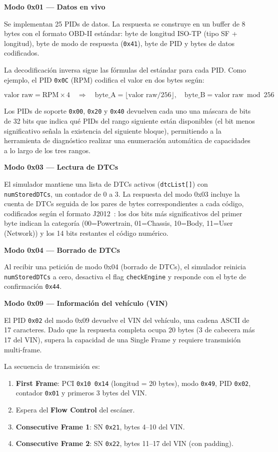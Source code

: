 \medskip
\noindent\textbf{Modo 0x01 — Datos en vivo}

Se implementan 25 PIDs de datos. La respuesta se construye en un buffer de 8 bytes con el formato OBD-II estándar: byte de longitud ISO-TP (tipo SF + longitud), byte de modo de respuesta (\texttt{0x41}), byte de PID y bytes de datos codificados.

La decodificación inversa sigue las fórmulas del estándar para cada PID. Como ejemplo, el PID \texttt{0x0C} (RPM) codifica el valor en dos bytes según:

\[
    \text{valor raw} = \text{RPM} \times 4 \quad \Rightarrow \quad
    \text{byte\_A} = \lfloor \text{valor raw} / 256 \rfloor, \quad
    \text{byte\_B} = \text{valor raw} \bmod 256
\]

Los PIDs de soporte \texttt{0x00}, \texttt{0x20} y \texttt{0x40} devuelven cada uno una máscara de bits de 32 bits que indica qué PIDs del rango siguiente están disponibles (el bit menos significativo señala la existencia del siguiente bloque), permitiendo a la herramienta de diagnóstico realizar una enumeración automática de capacidades a lo largo de los tres rangos.

\medskip
\noindent\textbf{Modo 0x03 — Lectura de DTCs}

El simulador mantiene una lista de DTCs activos (\texttt{dtcList[]}) con \texttt{numStoredDTCs}, un contador de 0 a 3. La respuesta del modo 0x03 incluye la cuenta de DTCs seguida de los pares de bytes correspondientes a cada código, codificados según el formato J2012~\cite{SAEJ2012:2016}: los dos bits más significativos del primer byte indican la categoría (00=Powertrain, 01=Chassis, 10=Body, 11=User (Network)) y los 14 bits restantes el código numérico.

\medskip
\noindent\textbf{Modo 0x04 — Borrado de DTCs}

Al recibir una petición de modo 0x04 (borrado de DTCs), el simulador reinicia \texttt{numStoredDTCs} a cero, desactiva el flag \texttt{checkEngine} y responde con el byte de confirmación \texttt{0x44}.

\medskip
\noindent\textbf{Modo 0x09 — Información del vehículo (VIN)}

El PID \texttt{0x02} del modo 0x09 devuelve el VIN del vehículo, una cadena ASCII de 17 caracteres. Dado que la respuesta completa ocupa 20 bytes (3 de cabecera más 17 del VIN), supera la capacidad de una Single Frame y requiere transmisión multi-frame.

La secuencia de transmisión es:
\begin{enumerate}
    \item \textbf{First Frame}: PCI \texttt{0x10 0x14} (longitud = 20 bytes), modo \texttt{0x49}, PID \texttt{0x02}, contador \texttt{0x01} y primeros 3 bytes del VIN.
    \item Espera del \textbf{Flow Control} del escáner.
    \item \textbf{Consecutive Frame 1}: SN \texttt{0x21}, bytes 4--10 del VIN.
    \item \textbf{Consecutive Frame 2}: SN \texttt{0x22}, bytes 11--17 del VIN (con padding).
\end{enumerate}

